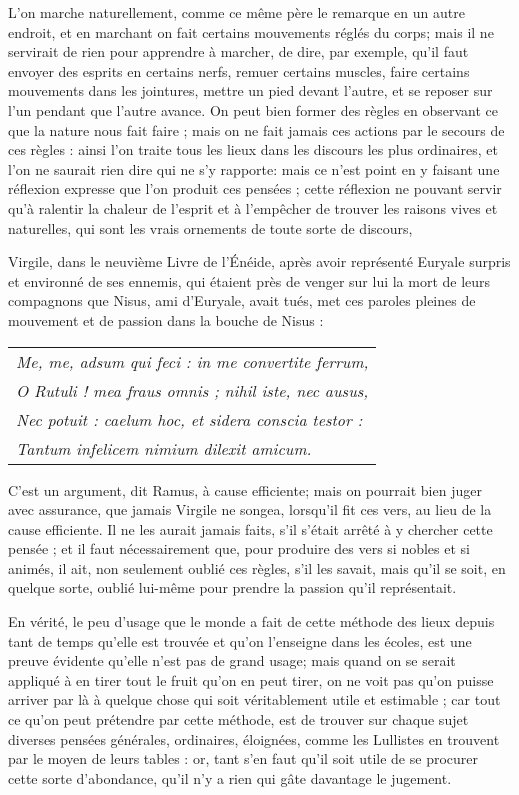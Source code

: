 L'on marche naturellement, comme ce même père le remarque en un autre endroit, et en marchant on fait certains mouvements réglés du corps; mais il ne servirait de rien pour apprendre à marcher, de dire, par exemple, qu'il faut envoyer des esprits en certains nerfs, remuer certains muscles, faire certains mouvements dans les jointures, mettre un pied devant l'autre, et se reposer sur l'un pendant que l'autre avance. On peut bien former des règles en observant ce que la nature nous fait faire ; mais on ne fait jamais ces actions par le secours de ces règles : ainsi l'on traite tous les lieux dans les discours les plus ordinaires, et l'on ne saurait rien dire qui ne s'y rapporte: mais ce n'est point en y faisant une réflexion expresse que l'on produit ces pensées ; cette réflexion ne pouvant servir qu'à ralentir la chaleur de l'esprit et à l'empêcher de trouver les raisons vives et naturelles, qui sont les vrais ornements de toute sorte de discours,

Virgile, dans le neuvième Livre de l'Énéide, après avoir représenté Euryale surpris et environné de ses ennemis, qui étaient près de venger sur lui la mort de leurs compagnons que Nisus, ami d'Euryale, avait tués, met ces paroles pleines de mouvement et de passion dans la bouche de Nisus :

	\begin{tabularx}{\textwidth}{X}
		\emph{Me, me, adsum qui feci : in me convertite ferrum,} \\
		\emph{O Rutuli ! mea fraus omnis ; nihil iste, nec ausus,} \\
		\emph{Nec potuit : caelum hoc, et sidera conscia testor :} \\
		\emph{Tantum infelicem nimium dilexit amicum.} \\
	\end{tabularx}

C'est un argument, dit Ramus, à cause efficiente; mais on pourrait bien juger avec assurance, que jamais Virgile ne songea, lorsqu'il fit ces vers, au lieu de la cause efficiente. Il ne les aurait jamais faits, s'il s'était arrêté à y chercher cette pensée ; et il faut nécessairement que, pour produire des vers si nobles et si animés, il ait, non seulement oublié ces règles, s'il les savait, mais qu'il se soit, en quelque sorte, oublié lui-même pour prendre la passion qu'il représentait.


En vérité, le peu d'usage que le monde a fait de cette méthode des lieux depuis tant de temps qu'elle est trouvée et qu'on l'enseigne dans les écoles, est une preuve évidente qu'elle n'est pas de grand usage; mais quand on se serait appliqué à en tirer tout le fruit qu'on en peut tirer, on ne voit pas qu'on puisse arriver par là à quelque chose qui soit véritablement utile et estimable ; car tout ce qu'on peut prétendre par cette méthode, est de trouver sur chaque sujet diverses pensées générales, ordinaires, éloignées, comme les Lullistes en trouvent par le moyen de leurs tables : or, tant s'en faut qu'il soit utile de se procurer cette sorte d'abondance, qu'il n'y a rien qui gâte davantage le jugement.

